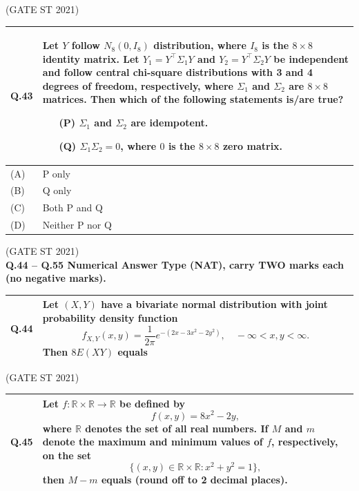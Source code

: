 \documentclass[journal,12pt,onecolumn]{IEEEtran}
\theoremstyle{remark}
\begin{document}
\bigskip
\hfill (GATE ST 2021)
\\
\begin{tabular}{|p{1cm}|p{14cm}|}
\hline
\textbf{Q.43} &
Let $Y$ follow $N_8(0, I_8)$ distribution, where $I_8$ is the $8 \times 8$ identity matrix. Let $Y_1 = Y^\top \Sigma_1 Y$ and $Y_2 = Y^\top \Sigma_2 Y$ be independent and follow central chi-square distributions with 3 and 4 degrees of freedom, respectively, where $\Sigma_1$ and $\Sigma_2$ are $8 \times 8$ matrices. Then which of the following statements is/are true?

\begin{itemize}
    \item[(P)] $\Sigma_1$ and $\Sigma_2$ are idempotent.
    \item[(Q)] $\Sigma_1 \Sigma_2 = 0$, where $0$ is the $8 \times 8$ zero matrix.
\end{itemize} \\
\hline

(A) & P only\\
\hline
(B) & Q only\\
\hline
(C) & Both P and Q\\
\hline
(D) & Neither P nor Q \\
\hline
\end{tabular}

\bigskip
\hfill (GATE ST 2021)
\\

\textbf{Q.44 -- Q.55 Numerical Answer Type (NAT), carry TWO marks each (no negative marks).}

\bigskip
\begin{tabular}{|p{1cm}|p{14cm}|}
\hline
\textbf{Q.44} &
Let $(X, Y)$ have a bivariate normal distribution with joint probability density function
$$
f_{X,Y}(x,y) = \frac{1}{2\pi} e^{-(2x - 3x^2 - 2y^2)},
\quad -\infty < x,y < \infty.
$$
Then $8 E(XY)$ equals\\
\hline
\end{tabular}

\bigskip
\hfill (GATE ST 2021)
\\
\begin{tabular}{|p{1cm}|p{14cm}|}
\hline
\textbf{Q.45} &
Let $f: \mathbb{R} \times \mathbb{R} \to \mathbb{R}$ be defined by
$$
f(x,y) = 8x^2 - 2y,
$$
where $\mathbb{R}$ denotes the set of all real numbers. If $M$ and $m$ denote the maximum and minimum values of $f$, respectively, on the set
$$
\{(x,y) \in \mathbb{R} \times \mathbb{R} : x^2 + y^2 = 1 \},
$$
then $M - m$ equals (round off to 2 decimal places).\\
\hline
\end{tabular}
\end{document}
